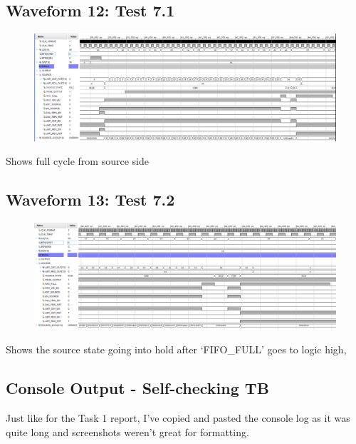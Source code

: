 \documentclass[11pt]{report}
\begin{document}
\subsection*{Waveform 12: Test 7.1 }
\begin{figure}[H]
       \includegraphics[width=\columnwidth]{Assets/Test7_1.png}
\end{figure}

Shows full cycle from source side\\

\subsection*{Waveform 13: Test 7.2 }
\begin{figure}[H]
       \includegraphics[width=\columnwidth]{Assets/Test7_2.png}
\end{figure}

Shows the source state going into hold after `FIFO\_FULL' goes to logic high,

\newpage

\subsection*{Console Output - Self-checking TB}

Just like for the Task 1 report, I've copied and pasted the console log as it was quite long and screenshots weren't great
for formatting.
\end{document}
